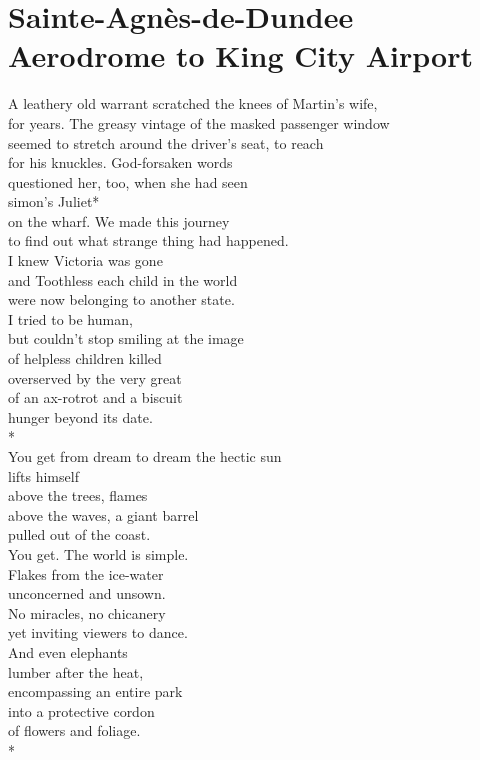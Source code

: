 \documentclass[smalldemyvopaper,11pt,twoside,onecolumn,openright,extrafontsizes]{memoir}
\begin{document}
\chapter{Sainte-Agnès-de-Dundee Aerodrome to King City Airport}
A leathery old warrant scratched the knees of Martin's wife,
\\for years. The greasy vintage of the masked passenger window
\\seemed to stretch around the driver's seat, to reach
\\for his knuckles. God-forsaken words
\\questioned her, too, when she had seen
\\simon's Juliet*
\\on the wharf. We made this journey
\\to find out what strange thing had happened.
\\I knew Victoria was gone
\\and Toothless each child in the world
\\were now belonging to another state.
\\I tried to be human,
\\but couldn't stop smiling at the image
\\of helpless children killed
\\overserved by the very great
\\of an ax-rotrot and a biscuit
\\hunger beyond its date.
\\*
\\You get from dream to dream the hectic sun
\\lifts himself
\\above the trees, flames
\\above the waves, a giant barrel
\\pulled out of the coast.
\\You get. The world is simple.
\\Flakes from the ice-water
\\unconcerned and unsown.
\\No miracles, no chicanery
\\yet inviting viewers to dance.
\\And even elephants
\\lumber after the heat,
\\encompassing an entire park
\\into a protective cordon
\\of flowers and foliage.
\\*
\end{document}
